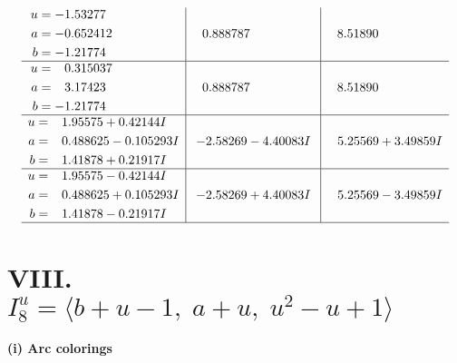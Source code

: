 \documentclass[1p]{elsarticle_modified}
\theoremstyle{definition}
\begin{document}
$$\begin{array}{c|c|c}
\begin{aligned}
u &= -1.53277\phantom{ +0.000000I} \\
a &= -0.652412\phantom{ +0.000000I} \\
b &= -1.21774\phantom{ +0.000000I}\end{aligned}
 & \phantom{-}0.888787\phantom{ +0.000000I} & \phantom{-}8.51890\phantom{ +0.000000I} \\ \hline\begin{aligned}
u &= \phantom{-}0.315037\phantom{ +0.000000I} \\
a &= \phantom{-}3.17423\phantom{ +0.000000I} \\
b &= -1.21774\phantom{ +0.000000I}\end{aligned}
 & \phantom{-}0.888787\phantom{ +0.000000I} & \phantom{-}8.51890\phantom{ +0.000000I} \\ \hline\begin{aligned}
u &= \phantom{-}1.95575 + 0.42144 I \\
a &= \phantom{-}0.488625 - 0.105293 I \\
b &= \phantom{-}1.41878 + 0.21917 I\end{aligned}
 & -2.58269 - 4.40083 I & \phantom{-}5.25569 + 3.49859 I \\ \hline\begin{aligned}
u &= \phantom{-}1.95575 - 0.42144 I \\
a &= \phantom{-}0.488625 + 0.105293 I \\
b &= \phantom{-}1.41878 - 0.21917 I\end{aligned}
 & -2.58269 + 4.40083 I & \phantom{-}5.25569 - 3.49859 I\\
 \hline 
 \end{array}$$\newpage\newpage\renewcommand{\arraystretch}{1}
\centering \section*{VIII. $I^u_{8}= \langle b+u-1,\;a+u,\;u^2- u+1 \rangle$}
\flushleft \textbf{(i) Arc colorings}\\
\end{document}
